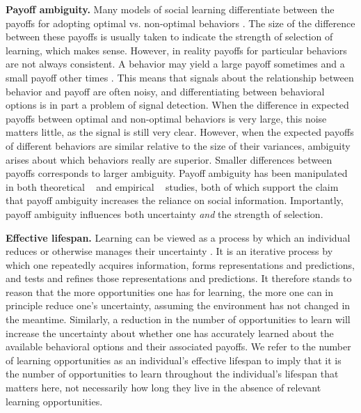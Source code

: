 \documentclass[letterpaper,11.5pt]{scrartcl}
\begin{document}
\textbf{Payoff ambiguity.}
Many models of social learning differentiate between the payoffs for adopting optimal vs. non-optimal behaviors \cite{Rogers1988,Enquist2007,Rendell2010}. The size of the difference between these payoffs is usually taken to indicate the strength of selection of learning, which makes sense. However, in reality payoffs for particular behaviors are not always consistent. A behavior may yield a large payoff sometimes and a small payoff other times \cite{McElreath2005}. This means that signals about the relationship between behavior and payoff are often noisy, and differentiating between behavioral options is in part a problem of signal detection.
When the difference in expected payoffs between optimal and non-optimal behaviors is very large, this noise matters little, as the signal is still very clear. However, when the expected payoffs of different behaviors are similar relative to the size of their variances, ambiguity arises about which behaviors really are superior. Smaller differences between payoffs corresponds to larger ambiguity. Payoff ambiguity has been manipulated in both theoretical ~\cite{perreault2012bayesian} and empirical ~\cite{McElreath2005, Morgan2012} studies, both of which support the claim that payoff ambiguity increases the reliance on social information. Importantly, payoff ambiguity %
influences both uncertainty \emph{and} the strength of selection. %

\textbf{Effective lifespan.}
Learning can be viewed as a process by which an individual reduces or otherwise manages their uncertainty \cite{jacobs2011bayesian,clark2013whatever}. It is an iterative process by which one repeatedly acquires information, forms representations and predictions, and tests and refines those representations and predictions. It therefore stands to reason that the more opportunities one has for learning, the more one can in principle reduce one's uncertainty, assuming the environment has not changed in the meantime. Similarly, a reduction in the number of opportunities to learn will increase the uncertainty about whether one has accurately learned about the available behavioral options and their associated payoffs. We refer to the number of learning opportunities as an individual's effective lifespan to imply that it is the number of opportunities to learn throughout the individual's lifespan that matters here, not necessarily how long they live in the absence of relevant learning opportunities.  
\end{document}
